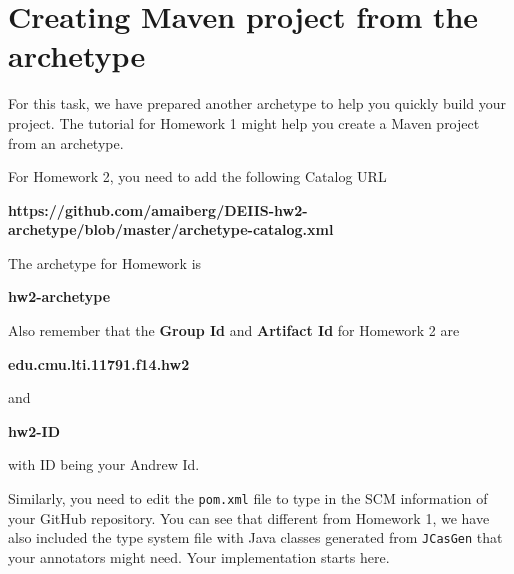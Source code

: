 
\section{Creating Maven project from the archetype}

For this task, we have prepared another archetype to help you quickly build your
project. The tutorial for Homework 1 might help you create a Maven project from
an archetype.

For Homework 2, you need to add the following Catalog URL

\begin{center}
\textbf{https://github.com/amaiberg/DEIIS-hw2-archetype/blob/master/archetype-catalog.xml}
\end{center}

The archetype for Homework is

\begin{center}
\textbf{hw2-archetype}
\end{center}

Also remember that the \textbf{Group Id} and \textbf{Artifact Id} for Homework 2
are

\begin{center}
\textbf{edu.cmu.lti.11791.f14.hw2}
\end{center}

and

\begin{center}
\textbf{hw2-ID}
\end{center}

with ID being your Andrew Id.

Similarly, you need to edit the \texttt{pom.xml} file to type in the SCM
information of your GitHub repository. You can see that different from Homework
1, we have also included the type system file with Java classes generated from
\texttt{JCasGen} that your annotators might need. Your implementation starts
here.

